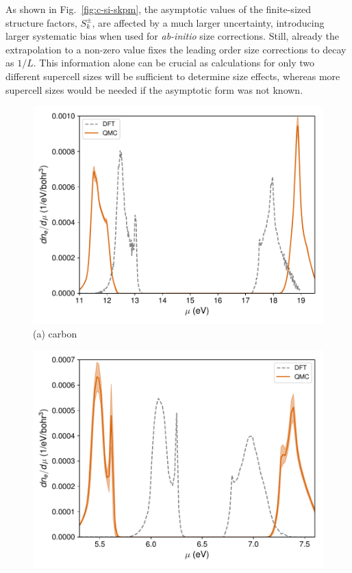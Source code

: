 As shown in Fig.~\ref{fig:c-si-skpm}, the asymptotic values of the finite-sized structure factors,
$S_k^\pm$, are affected by a much larger uncertainty, introducing larger systematic bias when
used for \emph{ab-initio} size corrections. Still, already the extrapolation to a non-zero
value fixes the leading order size corrections to decay as $1/L$. This information alone can be
crucial as calculations for only two different supercell sizes will be sufficient to determine size effects, whereas more supercell sizes would be needed if the asymptotic form was not known.

\begin{figure}
\begin{minipage}{0.49\columnwidth}
\includegraphics[width=\linewidth]{si35f_nf-c-dndmu}
(a) carbon
\end{minipage}
\begin{minipage}{0.49\columnwidth}
\includegraphics[width=\linewidth]{si35f_nf-si-dndmu}

\end{minipage}
\end{figure}
